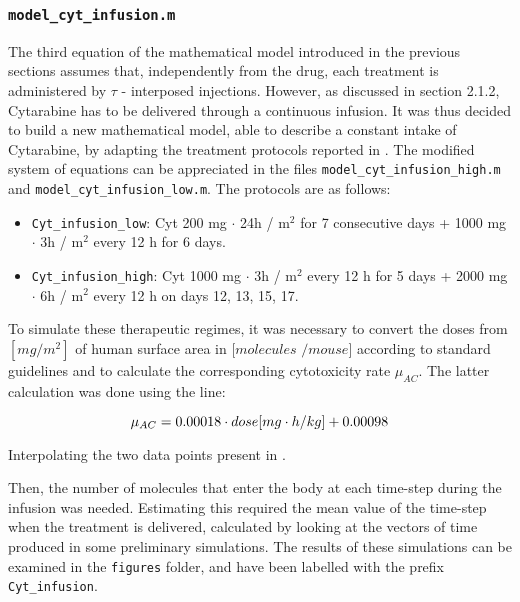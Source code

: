 \subsubsection{\texttt{model\_cyt\_infusion.m}}
The third equation of the mathematical model introduced in the previous sections assumes that, independently from the drug, each treatment is administered by $\tau$ - interposed injections. However, as discussed in section 2.1.2, Cytarabine has to be delivered through a continuous infusion. 
It was thus decided to build a new mathematical model, able to describe a constant intake of Cytarabine, by adapting the treatment protocols reported in \cite{cyt-3}. The modified system of equations can be appreciated in the files \texttt{model\_cyt\_infusion\_high.m} and \texttt{model\_cyt\_infusion\_low.m}. The protocols are as follows:

\begin{itemize}
	\item \texttt{Cyt\_infusion\_low}: Cyt 200 mg $\cdot$ 24h / m$^2$ for 7 consecutive days + 1000 mg $\cdot$ 3h / m$^2$ every 12 h for 6 days.
	\item \texttt{Cyt\_infusion\_high}: Cyt 1000 mg $\cdot$ 3h / m$^2$ every 12 h for 5 days + 2000 mg $\cdot$ 6h / m$^2$ every 12 h on days 12, 13, 15, 17.
\end{itemize}

To simulate these therapeutic regimes, it was necessary to convert the doses from $[mg / m^2]$ of human surface area in $[molecules$ $/mouse]$ according to standard guidelines \cite{dose-conversion} and to calculate the corresponding cytotoxicity rate $\mu_{AC}$. The latter calculation was done using the line: 

$$ \mu_{AC} = 0.00018 \cdot \small{dose} [mg \cdot h/kg]+ 0.00098 $$

Interpolating the two data points present in \cite{main-paper}. 

Then, the number of molecules that enter the body at each time-step during the infusion was needed. Estimating this required the mean value of the time-step when the treatment is delivered, calculated by looking at the vectors of time produced in some preliminary simulations. The results of these simulations can be examined in the \texttt{figures} folder, and have been labelled with the prefix \texttt{Cyt\_infusion}. 
